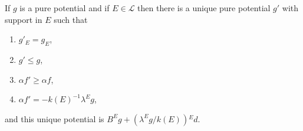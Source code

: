 If $g$ is a pure potential and if $E \in \mathcal{L}$ then there is a unique pure potential $g'$ with support in $E$ such that
\begin{enumerate}
\item $g'_E = g_E$,
\item $g' \leq g$,
\item $\alpha f' \geq \alpha f$,
\item $\alpha f' = -k(E)^{-1} \lambda^E g$,
\end{enumerate}
and this unique potential is $B^E g + (\lambda^E g/k(E)){}^E d$.
